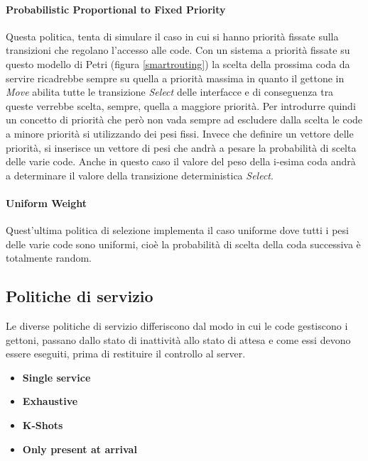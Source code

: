 \documentclass[12pt,a4paper,italian]{article}
\begin{document}
\paragraph{Probabilistic Proportional to Fixed Priority} Questa politica, tenta di simulare il caso in cui si hanno priorità fissate sulla transizioni che regolano l'accesso alle code. Con un sistema a priorità fissate su questo modello di Petri (figura \ref{smartrouting}) la scelta della prossima coda da servire ricadrebbe sempre su quella a priorità massima in quanto il gettone in \emph{Move} abilita tutte le transizione \emph{Select} delle interfacce e di conseguenza tra queste verrebbe scelta, sempre, quella a maggiore priorità. Per introdurre quindi un concetto di priorità che però non vada sempre ad escludere dalla scelta le code a minore priorità si utilizzando dei pesi fissi. Invece che definire un vettore delle priorità, si inserisce un vettore di pesi che andrà a pesare la probabilità di scelta delle varie code. Anche in questo caso il valore del peso della i-esima coda andrà a determinare il valore della transizione deterministica \emph{Select}. 

\paragraph{Uniform Weight} Quest'ultima politica di selezione implementa il caso uniforme dove tutti i pesi delle varie code sono uniformi, cioè la probabilità di scelta della coda successiva è totalmente random.

\subsection{Politiche di servizio}
Le diverse politiche di servizio differiscono dal modo in cui le code gestiscono i gettoni, passano dallo stato di inattività allo stato di attesa e come essi devono essere eseguiti, prima di restituire il controllo al server.

\begin{itemize}
	\item \textbf{Single service} 
	\item \textbf{Exhaustive} 
	\item \textbf{K-Shots} 
	\item \textbf{Only present at arrival}  
\end{itemize}
\end{document}
